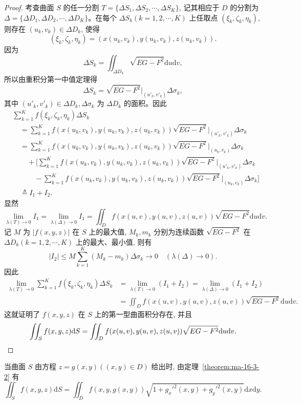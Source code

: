 \begin{proof}
考查曲面 $S$ 的任一分割 $T=\{\Delta S_1,\Delta S_2,\cdots,\Delta S_K\}$, 记其相应于 $D$ 的分割为 $\Delta=\{\Delta D_1,\Delta D_2,\cdots,\Delta D_K\}$。在每个 $\Delta S_k(k=1,2,\cdots,K)$ 上任取点 $(\xi_k,\zeta_k,\eta_k)$, 则存在 $(u_k,v_k)\in\Delta D_k$, 使得
\[
  (\xi_k,\zeta_k,\eta_k)=(x(u_k,v_k),y(u_k,v_k),z(u_k,v_k)).
\]
因为
\[
  \Delta S_k=\iint_{\Delta D_k}\sqrt{EG-F^2}\mathrm du\mathrm dv,
\]
所以由重积分第一中值定理得
\[
  \Delta S_k=\sqrt{EG-F^2}\bigg|_{(u'_k,v'_k)}\Delta\sigma_k,
\]
其中 $(u'_k,v'_k)\in\Delta D_k,\Delta\sigma_k$ 为 $\Delta D_k$ 的面积。因此
\[
\begin{aligned}
  &\sum_{k=1}^K f(\xi_k,\zeta_k,\eta_k)\Delta S_k\\
  &\quad=\sum_{k=1}^K f(x(u_k,v_k),y(u_k,v_k),z(u_k,v_k))
    \sqrt{EG-F^2}\bigg|_{(u'_k,v'_k)}\Delta\sigma_k\\
  &\quad=\sum_{k=1}^K f(x(u_k,v_k),y(u_k,v_k),z(u_k,v_k))
    \sqrt{EG-F^2}\bigg|_{(u_k,v_k)}\Delta\sigma_k\\
  &\qquad+\bigg[
    \sum_{k=1}^K f(x(u_k,v_k),y(u_k,v_k),z(u_k,v_k))
    \sqrt{EG-F^2}\bigg|_{(u'_k,v'_k)}\Delta\sigma_k\\
  &\qquad\quad-
    \sum_{k=1}^K f(x(u_k,v_k),y(u_k,v_k),z(u_k,v_k))
    \sqrt{EG-F^2}\bigg|_{(u_k,v_k)}\Delta\sigma_k
  \bigg]\\
  &\quad\triangleq I_1+I_2.
\end{aligned}
\]
显然
\[
  \lim_{\lambda(T)\to0}I_1=\lim_{\lambda(\Delta)\to0}I_1
  =\iint_D f(x(u,v),y(u,v),z(u,v))\sqrt{EG-F^2}\mathrm du\mathrm dv.
\]
记 $M$ 为 $|f(x,y,z)|$ 在 $S$ 上的最大值, $M_k,m_k$ 分别为连续函数 $\sqrt{EG-F^2}$ 在 $\Delta D_k(k=1,2,\cdots,K)$ 上的最大、最小值, 则有
\[
  |I_2|\leqslant M\sum_{k=1}^K(M_k-m_k)\Delta\sigma_k\to0
  \quad(\lambda(\Delta)\to0).
\]
因此
\[
\begin{aligned}
  \lim_{\lambda(T)\to0}\sum_{k=1}^K f(\xi_k,\zeta_k,\eta_k)\Delta S_k
  &=\lim_{\lambda(T)\to0}(I_1+I_2)
    =\lim_{\lambda(\Delta)\to0}(I_1+I_2)\\
  &=\iint_D f(x(u,v),y(u,v),z(u,v))\sqrt{EG-F^2}\mathrm du\mathrm dv.
\end{aligned}
\]
这就证明了 $f(x,y,z)$ 在 $S$ 上的第一型曲面积分存在, 并且
\[
  \iint_S f(x,y,z)\mathrm dS
  =\iint_D f(x(u,v),y(u,v),z(u,v))\sqrt{EG-F^2}\mathrm du\mathrm dv.
\qedhere
\]
\end{proof}


当曲面 $S$ 由方程 $z=g(x,y)((x,y)\in D)$ 给出时, 由定理~\ref{theorem:ma-16-3-2} 有
\[
  \iint_S f(x,y,z)\mathrm dS
  =\iint_D f(x,y,g(x,y))\sqrt{1+g_x'^2(x,y)+g_y'^2(x,y)}\mathrm dx\mathrm dy.
\]

